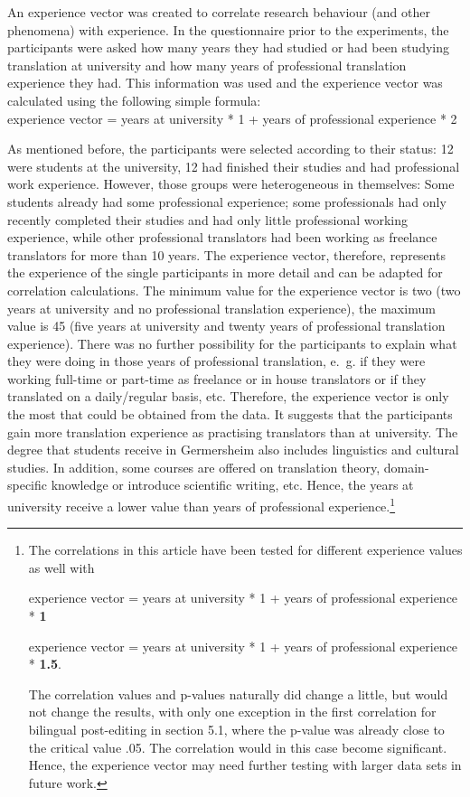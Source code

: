 \documentclass[output=paper]{langsci/langscibook}
\begin{document}
An experience vector was created to correlate research behaviour (and other phenomena) with experience. In the questionnaire prior to the experiments, the participants were asked how many years they had studied or had been studying translation at university and how many years of professional translation experience they had. This information was used and the experience vector was calculated using the following simple formula:\\

experience vector = years at university * 1 + years of professional experience * 2



As mentioned before, the participants were selected according to their status: 12 were students at the university, 12 had finished their studies and had professional work experience. However, those groups were heterogeneous in themselves: Some students already had some professional experience; some professionals had only recently completed their studies and had only little professional working experience, while other professional translators had been working as freelance translators for more than 10 years. The experience vector, therefore, represents the experience of the single participants in more detail and can be adapted for correlation calculations. The minimum value for the experience vector is two (two years at university and no professional translation experience), the maximum value is 45 (five years at university and twenty years of professional translation experience). There was no further possibility for the participants to explain what they were doing in those years of professional translation, e.~g. if they were working full-time or part-time as freelance or in house translators or if they translated on a daily/regular basis, etc. Therefore, the experience vector is only the most that could be obtained from the data. It suggests that the participants gain more translation experience as practising translators than at university. The degree that students receive in Germersheim also includes linguistics and cultural studies. In addition, some courses are offered on translation theory, domain-specific knowledge or introduce scientific writing, etc. Hence, the years at university receive a lower value than years of professional experience.\footnote{The correlations in this article have been tested for different experience values as well with\par   experience vector = years at university * 1 + years of professional experience * \textbf{1}\par   experience vector = years at university * 1 + years of professional experience *\textbf{ 1.5}.\par   The correlation values and p-values naturally did change a little, but would not change the results, with only one exception in the first correlation for bilingual post-editing in section 5.1, where the p-value was already close to the critical value .05. The correlation would in this case become significant. Hence, the experience vector may need further testing with larger data sets in future work.}
\end{document}
